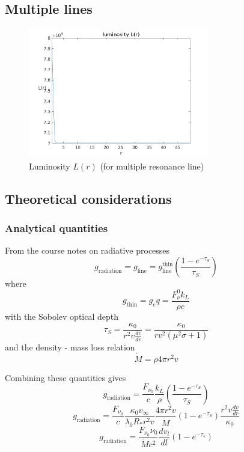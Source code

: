 \documentclass[../main/main.tex]{subfiles}
\begin{document}
\subsection{Multiple lines}
\begin{figure}[!htp]
\centering
\includegraphics[width=0.7\textwidth]{../../two_resonance_lines/figures/luminosity_multiple_resonance_line.png}
\caption{Luminosity $L(r)$ (for multiple resonance line)}
\label{luminosity_multiple_resonance_line}
\end{figure}

\subsection{Theoretical considerations}
\subsubsection{Analytical quantities}
From the course notes on radiative processes
\begin{equation}
g_{\text{radiation}} = g_{\text{line}} = g_{\text{line}}^{\text{thin}}\left( \frac{1- e^{-\tau_S}}{\tau_S} \right)
\end{equation}
where 
\begin{equation}
g_{\text{thin}} = g_e q = \frac{F_{\nu}^0 k_L}{\rho c}
\end{equation}
with the Sobolev optical depth
\begin{equation}
\tau_S = \frac{\kappa_0}{r^2 v \frac{dv}{dr}} = \frac{\kappa_0}{rv^2 (\mu^2 \sigma + 1)}
\end{equation}
and the density - mass loss relation
\begin{equation}
\dot{M} = \rho 4 \pi r^2 v
\end{equation}

Combining these quantities gives
\begin{equation}
g_{\text{radiation}} = \frac{F_{\nu_0}}{c}  \frac{k_L}{\rho }\left( \frac{1- e^{-\tau_S}}{\tau_S} \right) 
\end{equation}
\begin{equation}
g_{\text{radiation}} = \frac{F_{\nu_0}}{c} \frac{\kappa_0 v_{\infty}}{\lambda_0 R_* r^2 v} \frac{4 \pi r^2 v}{\dot{M}} \left( 1- e^{-\tau_S} \right) \frac{r^2 v \frac{dv}{dr}}{\kappa_0}
\end{equation}
\begin{equation}
\boxed{g_{\text{radiation}} = \frac{F_{\nu_0} \nu_0 }{\dot{M} c^2} \frac{dv_l}{dl} \left(1-e^{- \tau_s} \right)}
\end{equation}
\end{document}
